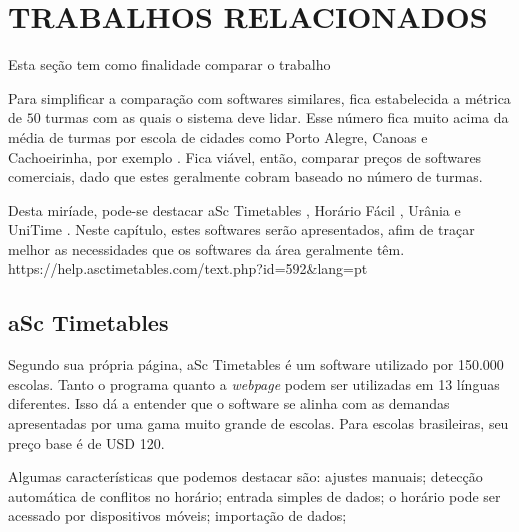 \documentclass[12pt,a4paper]{article}
\begin{document}
	\newpage

	\section{TRABALHOS RELACIONADOS}

		Esta seção tem como finalidade comparar o trabalho

		\par Para simplificar a comparação com softwares similares, fica estabelecida a métrica de $50$ turmas com as quais o sistema deve lidar. Esse número fica muito acima da média de turmas por escola de cidades como Porto Alegre, Canoas e Cachoeirinha, por exemplo \cite{inep}. Fica viável, então, comparar preços de softwares comerciais, dado que estes geralmente cobram baseado no número de turmas.

		\par Desta miríade, pode-se destacar aSc Timetables \cite{rel_asctimetables}, Horário Fácil \cite{rel_horariofacil}, Urânia \cite{rel_urania} e UniTime \cite{rel_unitime}. Neste capítulo, estes softwares serão apresentados, afim de traçar melhor as necessidades que os softwares da área geralmente têm. https://help.asctimetables.com/text.php?id=592\&lang=pt

		\subsection{aSc Timetables}

			\par Segundo sua própria página, aSc Timetables é um software utilizado por 150.000 escolas. Tanto o programa quanto a \textit{webpage} podem ser utilizadas em 13 línguas diferentes. Isso dá a entender que o software se alinha com as demandas apresentadas por uma gama muito grande de escolas. Para escolas brasileiras, seu preço base é de USD 120.

			\par Algumas características que podemos destacar são: ajustes manuais; detecção automática de conflitos no horário; entrada simples de dados;  o horário pode ser acessado por dispositivos móveis; importação de dados;
\end{document}
